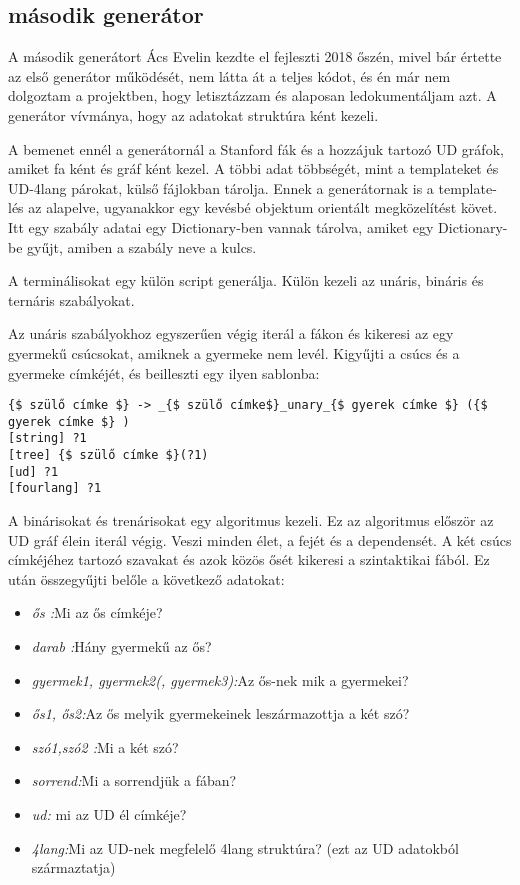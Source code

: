 \subsection{második generátor}
A második generátort Ács Evelin kezdte el fejleszti 2018 őszén, mivel bár értette az első generátor működését, nem látta át a teljes kódot, és én már nem dolgoztam a projektben, hogy letisztázzam és alaposan ledokumentáljam azt. A generátor vívmánya, hogy az adatokat struktúra ként kezeli.

A bemenet ennél a generátornál a Stanford fák és a hozzájuk tartozó UD gráfok, amiket fa ként és gráf ként kezel. A többi adat többségét, mint a templateket és UD-4lang párokat, külső fájlokban tárolja. Ennek a generátornak is a template-lés az alapelve, ugyanakkor egy kevésbé objektum orientált megközelítést követ. Itt egy szabály adatai egy Dictionary-ben vannak tárolva, amiket egy Dictionary-be gyűjt, amiben a szabály neve a kulcs.

A terminálisokat egy külön script generálja. Külön kezeli az unáris, bináris és ternáris szabályokat.

Az unáris szabályokhoz egyszerűen végig iterál a fákon és kikeresi az egy gyermekű csúcsokat, amiknek a gyermeke nem levél. Kigyűjti a csúcs és a gyermeke címkéjét, és beilleszti egy ilyen sablonba:

\begin{verbatim}
{$ szülő címke $} -> _{$ szülő címke$}_unary_{$ gyerek címke $} ({$ gyerek címke $} )
[string] ?1
[tree] {$ szülő címke $}(?1)
[ud] ?1
[fourlang] ?1
\end{verbatim}

A binárisokat és trenárisokat egy algoritmus kezeli. Ez az algoritmus először az UD gráf élein iterál végig. Veszi minden élet, a fejét és a dependensét. A két csúcs címkéjéhez tartozó szavakat és azok közös ősét kikeresi a szintaktikai fából. Ez után összegyűjti belőle a következő adatokat:
\begin{itemize}
\item \emph{ős :}Mi az ős címkéje?
\item \emph{darab :}Hány gyermekű az ős?
\item \emph{gyermek1, gyermek2(, gyermek3):}Az ős-nek mik a gyermekei?
\item \emph{ős1, ős2:}Az ős melyik gyermekeinek leszármazottja a két szó?
\item \emph{szó1,szó2 :}Mi a két szó?
\item \emph{sorrend:}Mi a sorrendjük a fában?
\item \emph{ud: }mi az UD él címkéje?
\item \emph{4lang:}Mi az UD-nek megfelelő 4lang struktúra? (ezt az UD adatokból származtatja)
\end{itemize} 


